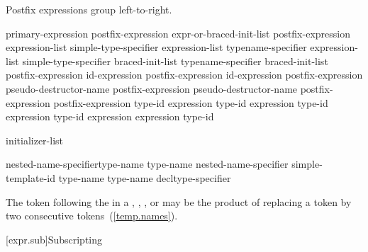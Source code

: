 \pnum
Postfix expressions group left-to-right.

\begin{bnf}
\br
    primary-expression\br
    postfix-expression \terminal{[} expr-or-braced-init-list \terminal{]}\br
    postfix-expression \terminal{(} expression-list\opt \terminal{)}\br
    simple-type-specifier \terminal{(} expression-list\opt \terminal{)}\br
    typename-specifier \terminal{(} expression-list\opt \terminal{)}\br
    simple-type-specifier braced-init-list\br
    typename-specifier braced-init-list\br
    postfix-expression \opt id-expression\br
    postfix-expression \opt id-expression\br
    postfix-expression  pseudo-destructor-name\br
    postfix-expression \terminal{->} pseudo-destructor-name\br
    postfix-expression \terminal{++}\br
    postfix-expression \terminal{-{-}}\br
     type-id \terminal{> (} expression \terminal{)}\br
     type-id \terminal{> (} expression \terminal{)}\br
     type-id \terminal{> (} expression \terminal{)}\br
     type-id \terminal{> (} expression \terminal{)}\br
     expression \terminal{)}\br
     type-id \terminal{)}
\end{bnf}


\begin{bnf}
\br
    initializer-list
\end{bnf}


\begin{bnf}
\br
    nested-name-specifier\opt type-name \terminal{::\,\tilde} type-name\br
    nested-name-specifier  simple-template-id \terminal{::\,\tilde} type-name\br
    \terminal{\tilde} type-name\br
    \terminal{\tilde} decltype-specifier
\end{bnf}

\pnum
\enternote The \tcode{>} token following the
 in a ,
, , or
 may be the product of replacing a
\tcode{>{>}} token by two consecutive \tcode{>}
tokens~(\ref{temp.names}).\exitnote

[expr.sub]{Subscripting}

